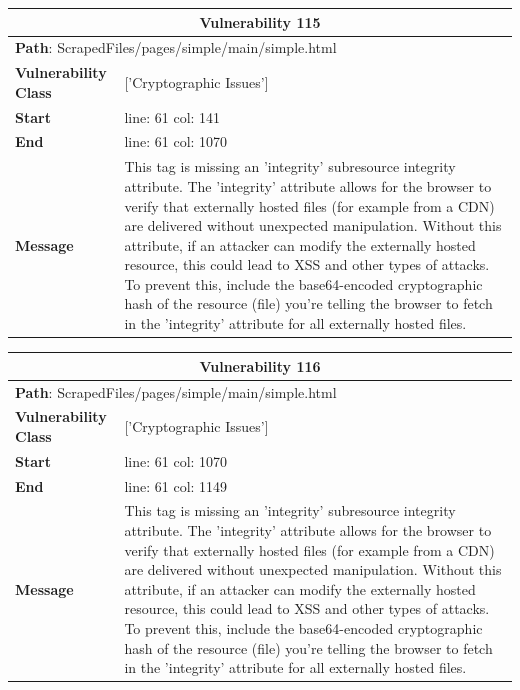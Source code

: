 \documentclass[12pt]{article}
\begin{document}
\FloatBarrier
\begin{table}[!h]
\centering
\renewcommand{\arraystretch}{1.3}
\begin{tabular}{|l|p{10cm}|}
\hline
\multicolumn{2}{|c|}{\textbf{Vulnerability 115}} \\
\hline
\multicolumn{2}{|l|}{\textbf{Path}: ScrapedFiles/pages/simple/main/simple.html} \\
\hline
\textbf{Vulnerability Class} & ['Cryptographic Issues'] \\
\hline
\textbf{Start} & line: 61 \quad col: 141 \\
\hline
\textbf{End} & line: 61 \quad col: 1070 \\
\hline
\textbf{Message} & This tag is missing an 'integrity' subresource integrity attribute. The 'integrity' attribute allows for the browser to verify that externally hosted files (for example from a CDN) are delivered without unexpected manipulation. Without this attribute, if an attacker can modify the externally hosted resource, this could lead to XSS and other types of attacks. To prevent this, include the base64-encoded cryptographic hash of the resource (file) you're telling the browser to fetch in the 'integrity' attribute for all externally hosted files. \\
\hline
\end{tabular}
\end{table}
\vspace{0.7cm}
\FloatBarrier
\begin{table}[!h]
\centering
\renewcommand{\arraystretch}{1.3}
\begin{tabular}{|l|p{10cm}|}
\hline
\multicolumn{2}{|c|}{\textbf{Vulnerability 116}} \\
\hline
\multicolumn{2}{|l|}{\textbf{Path}: ScrapedFiles/pages/simple/main/simple.html} \\
\hline
\textbf{Vulnerability Class} & ['Cryptographic Issues'] \\
\hline
\textbf{Start} & line: 61 \quad col: 1070 \\
\hline
\textbf{End} & line: 61 \quad col: 1149 \\
\hline
\textbf{Message} & This tag is missing an 'integrity' subresource integrity attribute. The 'integrity' attribute allows for the browser to verify that externally hosted files (for example from a CDN) are delivered without unexpected manipulation. Without this attribute, if an attacker can modify the externally hosted resource, this could lead to XSS and other types of attacks. To prevent this, include the base64-encoded cryptographic hash of the resource (file) you're telling the browser to fetch in the 'integrity' attribute for all externally hosted files. \\
\hline
\end{tabular}
\end{table}
\end{document}
